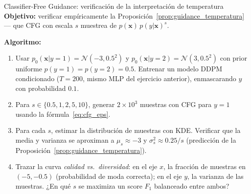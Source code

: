 \begin{ejerciciocomp}{Classifier-Free Guidance: verificación de la interpretación de temperatura}
\textbf{Objetivo:} verificar empíricamente la Proposición~\ref{prop:guidance_temperatura}
— que CFG con escala $s$ muestrea de $p(\bm{x})\,p(y|\bm{x})^s$.

\medskip\noindent\textbf{Algoritmo:}
\begin{enumerate}
  \item Usar $p_0(\bm{x}|y=1)=\mathcal{N}(-3,0.5^2)$ y $p_0(\bm{x}|y=2)=
        \mathcal{N}(3,0.5^2)$ con prior uniforme $p(y=1)=p(y=2)=0.5$.
        Entrenar un modelo DDPM condicionado ($T=200$, mismo MLP del ejercicio
        anterior), enmascarando $y$ con probabilidad $0.1$.
  \item Para $s\in\{0.5, 1, 2, 5, 10\}$, generar $2\times10^3$ muestras con
        CFG para $y=1$ usando la fórmula~\eqref{eq:cfg_eps}.
  \item Para cada $s$, estimar la distribución de muestras con KDE. Verificar
        que la media y varianza se aproximan a $\mu_s\approx -3$ y
        $\sigma_s^2\approx 0.25/s$ (predicción de la
        Proposición~\ref{prop:guidance_temperatura}).
  \item Trazar la curva \textit{calidad vs.\ diversidad}: en el eje $x$,
        la fracción de muestras en $(-5,-0.5)$ (probabilidad de moda correcta);
        en el eje $y$, la varianza de las muestras. ¿En qué $s$ se maximiza
        un score $F_1$ balanceado entre ambos?
\end{enumerate}
\end{ejerciciocomp}

